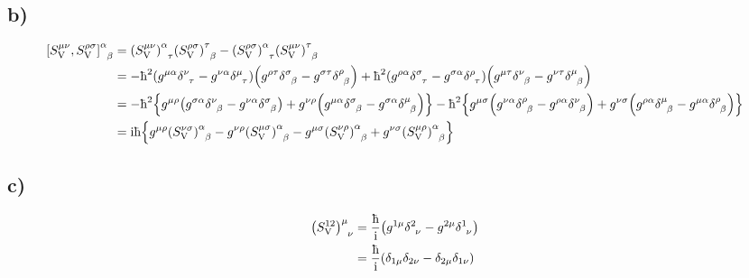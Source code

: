 \documentclass[twoside]{amsart}
\numberwithin{equation}{section}
\begin{document}
\subsection*{\textbf{b)}}

\begin{align*}
    \tensor{\comm{S^{\mu\nu}_{\textnormal{V}}}{S^{\rho\sigma}_{\textnormal{V}}}}{^\alpha_\beta}&=\tensor{\qty(S^{\mu\nu}_{\textnormal{V}})}{^\alpha_\tau}\tensor{\qty(S^{\rho\sigma}_{\textnormal{V}})}{^\tau_\beta}-\tensor{\qty(S^{\rho\sigma}_{\textnormal{V}})}{^\alpha_\tau}\tensor{\qty(S^{\mu\nu}_{\textnormal{V}})}{^\tau_\beta}\\
    &=-\hbar^2\qty(g^{\mu\alpha}\tensor{\delta}{^\nu_\tau}-g^{\nu\alpha}\tensor{\delta}{^\mu_\tau})\qty(g^{\rho\tau}\tensor{\delta}{^\sigma_\beta}-g^{\sigma\tau}\tensor{\delta}{^\rho_\beta})+\hbar^2\qty(g^{\rho\alpha}\tensor{\delta}{^\sigma_\tau}-g^{\sigma\alpha}\tensor{\delta}{^\rho_\tau})\qty(g^{\mu\tau}\tensor{\delta}{^\nu_\beta}-g^{\nu\tau}\tensor{\delta}{^\mu_\beta})\\
    &=-\hbar^2\qty{g^{\mu\rho}\qty(g^{\sigma\alpha}\tensor{\delta}{^\nu_\beta}-g^{\nu\alpha}\tensor{\delta}{^\sigma_\beta})+g^{\nu\rho}\qty(g^{\mu\alpha}\tensor{\delta}{^\sigma_\beta}-g^{\sigma\alpha}\tensor{\delta}{^\mu_\beta})}-\hbar^2\qty{g^{\mu\sigma}\qty(g^{\nu\alpha}\tensor{\delta}{^\rho_\beta}-g^{\rho\alpha}\tensor{\delta}{^\nu_\beta})+g^{\nu\sigma}\qty(g^{\rho\alpha}\tensor{\delta}{^\mu_\beta}-g^{\mu\alpha}\tensor{\delta}{^\rho_\beta})}\\
    &=\im\hbar\qty{g^{\mu\rho}\tensor{\qty(S^{\nu\sigma}_{\textnormal{V}})}{^\alpha_\beta}-g^{\nu\rho}\tensor{\qty(S^{\mu\sigma}_{\textnormal{V}})}{^\alpha_\beta}-g^{\mu\sigma}\tensor{\qty(S^{\nu\rho}_{\textnormal{V}})}{^\alpha_\beta}+g^{\nu\sigma}\tensor{\qty(S^{\mu\rho}_{\textnormal{V}})}{^\alpha_\beta}}
\end{align*}

\subsection*{\textbf{c)}}

\begin{align*}
    \tensor{\qty(S^{12}_{\textnormal{V}})}{^\mu_\nu}&=\frac\hbar\im\qty(g^{1\mu}\tensor{\delta}{^2_\nu}-g^{2\mu}\tensor{\delta}{^1_\nu})\\
    &=\frac\hbar\im\qty(\delta_{1\mu}\delta_{2\nu}-\delta_{2\mu}\delta_{1\nu})
\end{align*}
\end{document}
